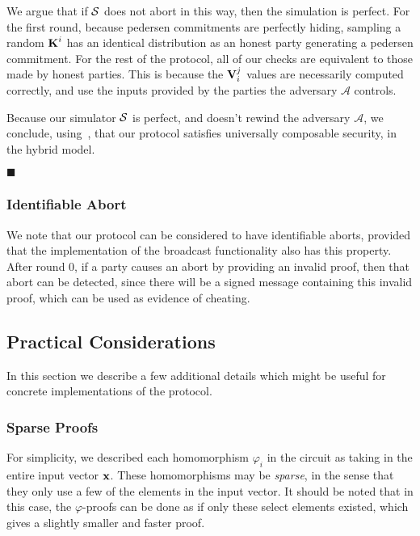 We argue that if $\mathcal{S}$ does not abort in this way, then the simulation
is perfect. For the first round, because pedersen commitments
are perfectly hiding, sampling a random $\textbf{K}^i$ has an identical
distribution as an honest party generating a pedersen commitment.
For the rest of the protocol, all of our checks are equivalent
to those made by honest parties. This is because the
$\textbf{V}^j_i$ values are necessarily computed correctly, and use
the inputs provided by the parties the adversary $\mathcal{A}$ controls.

Because our simulator $\mathcal{S}$ is perfect, and doesn't
rewind the adversary $\mathcal{A}$, we conclude,
using~\cite{kushilevitz_information-theoretically_2009},
that our protocol
satisfies universally composable security, in the hybrid model.

$\blacksquare$

\subsubsection{Identifiable Abort}

We note that our protocol can be considered to have identifiable
aborts, provided that the implementation of the broadcast functionality
also has this property.
After round $0$, if a party causes an abort by providing an invalid
proof, then that abort can be detected, since there will be
a signed message containing this invalid proof, which can be used
as evidence of cheating.

\subsection{Practical Considerations}

In this section we describe a few additional details which might
be useful for concrete implementations of the protocol.

\subsubsection{Sparse Proofs}

For simplicity, we described each homomorphism $\varphi_i$ in the circuit
as taking in the entire input vector $\textbf{x}$.
These homomorphisms may be \emph{sparse}, in the sense
that they only use a few of the elements in the input vector.
It should be noted that in this case, the $\varphi$-proofs can
be done as if only these select elements existed, which gives
a slightly smaller and faster proof.

